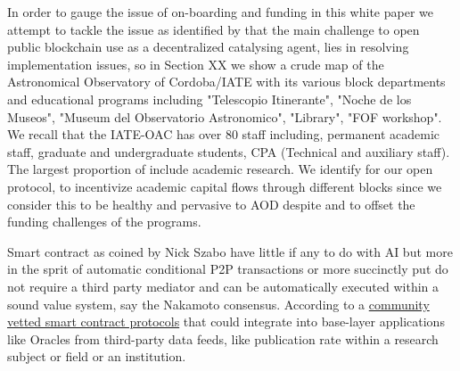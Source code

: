 \documentclass[final,5p,times,twocolumn,authoryear]{elsarticle}
\begin{document}
In order to gauge the issue of on-boarding and funding in this white paper we attempt to tackle the issue as identified by \cite{20d30b4efb014b21b7ab27f5218692ab} that the main challenge to open public blockchain use as a decentralized catalysing agent, lies in resolving implementation issues, so in Section XX we show a crude map of the Astronomical Observatory of Cordoba/IATE with its various block departments and educational programs including "Telescopio Itinerante", "Noche de los Museos", "Museum del Observatorio Astronomico", "Library", "FOF workshop". We recall that the IATE-OAC has over 80 staff including, permanent academic staff, graduate and undergraduate students,  CPA (Technical and auxiliary staff). The largest proportion of include academic research. We identify for our open protocol, to incentivize academic capital flows through different blocks since we  consider this to be healthy and pervasive to AOD despite and to offset the funding challenges of the programs.

Smart contract as coined by Nick Szabo have little if any to do with AI but more in the sprit of automatic conditional P2P transactions or more succinctly put do not require a third party mediator and can be automatically executed within a sound value system, say the Nakamoto consensus. According to a \href{https://www.fon.hum.uva.nl/rob/Courses/InformationInSpeech/CDROM/Literature/LOTwinterschool2006/szabo.best.vwh.net/smart_contracts_2.html}{community vetted smart contract protocols} that could integrate into base-layer applications like Oracles from third-party data feeds, like publication rate within a research subject or field or an institution. 
\end{document}
